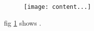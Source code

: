\documentclass{article}
\begin{document}
	\begin{figure}
		\texttt{[image: content...]}
		\caption{}
		\label{fig:}
	\end{figure}
fig \ref{fig:} shows .
\end{document}
